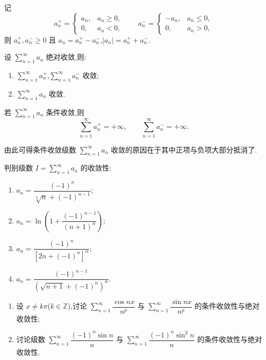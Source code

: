 \documentclass[../../数学分析培优讲义.tex]{subfiles}
\begin{document}
记
\[
    a_n^+=\begin{cases}a_n,&a_n\geq0,\\0,&a_n<0,
    \end{cases}
    \qquad
    a_n^-=\begin{cases}-a_n,&a_n\leq0,\\0,&a_n>0,
    \end{cases}
\]
则 $a_n^+,a_n^-\geq0$ 且 $a_n=a_n^+-a_n^-$,$|a_n|=a_n^++a_n^-$.

\begin{theorem}[\markstar]
设 $\displaystyle\sum\limits_{n=1}^{\infty}a_n$ 绝对收敛,则:
\begin{enumerate}[label=(\arabic*)]
    \item $\displaystyle\sum\limits_{n=1}^{\infty}a_n^+$,$\displaystyle\sum\limits_{n=1}^{\infty}a_n^-$ 收敛;
    \item $\displaystyle\sum\limits_{n=1}^{\infty}a_n$ 收敛.
\end{enumerate}
\end{theorem}

\begin{corollary}[\markstar]
若 $\displaystyle\sum\limits_{n=1}^{\infty}a_n$ 条件收敛,则
\[
    \sum\limits_{n=1}^{\infty}a_n^+=+\infty,
    \qquad
    \sum\limits_{n=1}^{\infty}a_n^-=+\infty.
\]
\end{corollary}

\begin{remark}
由此可得条件收敛级数 $\displaystyle\sum\limits_{n=1}^{\infty}a_n$ 收敛的原因在于其中正项与负项大部分抵消了.
\end{remark}

\begin{example}
判别级数 $\displaystyle I=\sum\limits_{n=1}^{\infty}a_n$ 的收敛性:
\begin{enumerate}[label=(\arabic*)]
    \item $\displaystyle a_n=\dfrac{(-1)^n}{\sqrt[3]{n}+(-1)^{n-1}}$;
    \item $\displaystyle a_n=\ln\left(1+\dfrac{(-1)^{n-1}}{(n+1)^\alpha}\right)$;
    \item $\displaystyle a_n=\dfrac{(-1)^n}{[2n+(-1)^n]^\alpha}$;
    \item $\displaystyle a_n=\dfrac{(-1)^{n-1}}{(\sqrt{n+1}+(-1)^n)^\alpha}$.
\end{enumerate}
\end{example}
\exampleblank

\begin{example}
\begin{enumerate}[label=(\arabic*)]
    \item 设 $x\neq k\pi$($k\in\mathbb{Z}$),讨论 $\displaystyle\sum\limits_{n=1}^{\infty}\dfrac{\cos nx}{n^p}$ 与 $\displaystyle\sum\limits_{n=1}^{\infty}\dfrac{\sin nx}{n^p}$ 的条件收敛性与绝对收敛性;
    \item 讨论级数 $\displaystyle\sum\limits_{n=1}^{\infty}\dfrac{(-1)^n\sin n}{n}$ 与 $\displaystyle\sum\limits_{n=1}^{\infty}\dfrac{(-1)^n\sin^2n}{n}$ 的条件收敛性与绝对收敛性.
\end{enumerate}
\end{example}
\exampleblank
\end{document}
